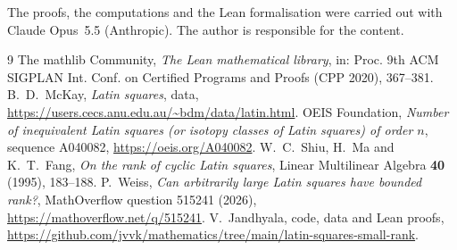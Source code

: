 \documentclass[11pt]{amsart}
\theoremstyle{remark}
\begin{document}
The proofs, the computations and the Lean formalisation were carried out with Claude Opus~5.5 (Anthropic). The author is responsible for the content.

\begin{thebibliography}{9}
 The mathlib Community, \emph{The Lean mathematical library}, in: Proc. 9th ACM SIGPLAN Int. Conf. on Certified Programs and Proofs (CPP 2020), 367--381.
 B.~D.~McKay, \emph{Latin squares}, data, \url{https://users.cecs.anu.edu.au/~bdm/data/latin.html}.
 OEIS Foundation, \emph{Number of inequivalent Latin squares (or isotopy classes of Latin squares) of order $n$}, sequence A040082, \url{https://oeis.org/A040082}.
 W.~C.~Shiu, H.~Ma and K.~T.~Fang, \emph{On the rank of cyclic Latin squares}, Linear Multilinear Algebra \textbf{40} (1995), 183--188.
 P.~Weiss, \emph{Can arbitrarily large Latin squares have bounded rank?}, MathOverflow question 515241 (2026), \url{https://mathoverflow.net/q/515241}.
 V.~Jandhyala, code, data and Lean proofs, \url{https://github.com/jvvk/mathematics/tree/main/latin-squares-small-rank}.
\end{thebibliography}
\end{document}
